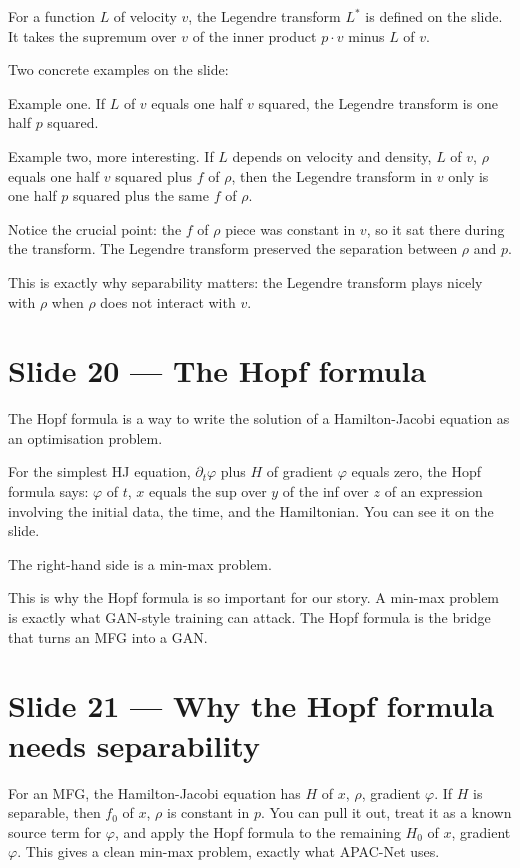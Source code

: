 \documentclass[11pt]{article}
\begin{document}
For a function $L$ of velocity $v$, the Legendre transform $L^*$ is defined
on the slide. It takes the supremum over $v$ of the inner product $p \cdot
v$ minus $L$ of $v$.

Two concrete examples on the slide:

Example one. If $L$ of $v$ equals one half $v$ squared, the Legendre
transform is one half $p$ squared.

Example two, more interesting. If $L$ depends on velocity and density, $L$
of $v$, $\rho$ equals one half $v$ squared plus $f$ of $\rho$, then the
Legendre transform in $v$ only is one half $p$ squared plus the same $f$ of
$\rho$.

Notice the crucial point: the $f$ of $\rho$ piece was constant in $v$, so
it sat there during the transform. The Legendre transform preserved the
separation between $\rho$ and $p$.

This is exactly why separability matters: the Legendre transform plays
nicely with $\rho$ when $\rho$ does not interact with $v$.

\section*{Slide 20 --- The Hopf formula}

The Hopf formula is a way to write the solution of a Hamilton-Jacobi
equation as an optimisation problem.

For the simplest HJ equation, $\partial_t \varphi$ plus $H$ of gradient $\varphi$
equals zero, the Hopf formula says: $\varphi$ of $t$, $x$ equals the sup
over $y$ of the inf over $z$ of an expression involving the initial data,
the time, and the Hamiltonian. You can see it on the slide.

The right-hand side is a min-max problem.

This is why the Hopf formula is so important for our story. A min-max problem
is exactly what GAN-style training can attack. The Hopf formula is the
bridge that turns an MFG into a GAN.

\section*{Slide 21 --- Why the Hopf formula needs separability}

For an MFG, the Hamilton-Jacobi equation has $H$ of $x$, $\rho$, gradient
$\varphi$. If $H$ is separable, then $f_0$ of $x$, $\rho$ is constant in
$p$. You can pull it out, treat it as a known source term for $\varphi$, and
apply the Hopf formula to the remaining $H_0$ of $x$, gradient $\varphi$.
This gives a clean min-max problem, exactly what APAC-Net uses.
\end{document}
